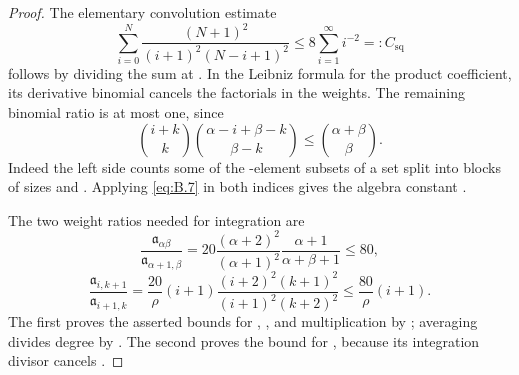 \begin{proof}
The elementary convolution estimate
\begin{equation}
  \sum_{i=0}^{N}\frac{(N+1)^2}{(i+1)^2(N-i+1)^2}
  \leq 8\sum_{i=1}^{\infty}i^{-2}=:C_{\mathrm{sq}}
  \tag{B.7}\label{eq:B.7}
\end{equation}
follows by dividing the sum at . In the Leibniz formula for the product
coefficient, its derivative binomial cancels the factorials in the weights. The remaining binomial
ratio is at most one, since
\begin{equation}
  \binom{i+k}{k}\binom{\alpha-i+\beta-k}{\beta-k}
  \leq\binom{\alpha+\beta}{\beta}.
  \tag{B.8}\label{eq:B.8}
\end{equation}
Indeed the left side counts some of the -element subsets of a set split
into blocks of sizes  and
. Applying \eqref{eq:B.7} in both indices gives the algebra
constant .

%
The two weight ratios needed for integration are
\begin{equation}
  \frac{\mathfrak a_{\alpha\beta}}{\mathfrak a_{\alpha+1,\beta}}
  =20\frac{(\alpha+2)^2}{(\alpha+1)^2}\frac{\alpha+1}{\alpha+\beta+1}
  \leq80,
  \tag{B.9}\label{eq:B.9}
\end{equation}
\begin{equation}
  \frac{\mathfrak a_{i,k+1}}{\mathfrak a_{i+1,k}}
  =\frac{20}{\rho}(i+1)\frac{(i+2)^2(k+1)^2}{(i+1)^2(k+2)^2}
  \leq\frac{80}{\rho}(i+1).
  \tag{B.10}\label{eq:B.10}
\end{equation}
The first proves the asserted bounds for ,
, and multiplication by ; averaging
divides degree  by . The second proves
the bound for , because its integration divisor
cancels .


\end{proof}
